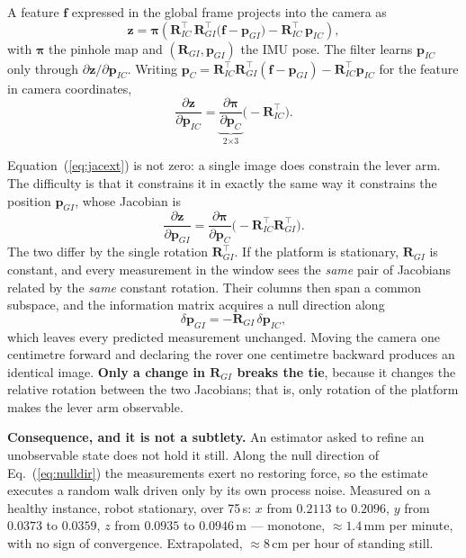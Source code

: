 A feature $\mathbf{f}$ expressed in the global frame projects into the
camera as
\begin{equation}
\mathbf{z} = \boldsymbol{\pi}\!\left(
  \mathbf{R}_{IC}^{\top}\,\mathbf{R}_{GI}^{\top}
  \bigl(\mathbf{f} - \mathbf{p}_{GI}\bigr) - \mathbf{R}_{IC}^{\top}\,\mathbf{p}_{IC}
\right),
\label{eq:projext}
\end{equation}
with $\boldsymbol\pi$ the pinhole map and $(\mathbf{R}_{GI},
\mathbf{p}_{GI})$ the IMU pose. The filter learns $\mathbf{p}_{IC}$ only
through $\partial \mathbf{z} / \partial \mathbf{p}_{IC}$. Writing
$\mathbf{p}_C = \mathbf{R}_{IC}^{\top}\mathbf{R}_{GI}^{\top}(\mathbf{f} -
\mathbf{p}_{GI}) - \mathbf{R}_{IC}^{\top}\mathbf{p}_{IC}$ for the feature in
camera coordinates,
\begin{equation}
\frac{\partial \mathbf{z}}{\partial \mathbf{p}_{IC}}
  = \underbrace{\frac{\partial \boldsymbol\pi}{\partial \mathbf{p}_C}}_{\text{2}\times\text{3}}
    \bigl(-\mathbf{R}_{IC}^{\top}\bigr).
\label{eq:jacext}
\end{equation}

Equation~(\ref{eq:jacext}) is not zero: a single image does constrain the
lever arm. The difficulty is that it constrains it in exactly the same way
it constrains the position $\mathbf{p}_{GI}$, whose Jacobian is
\begin{equation}
\frac{\partial \mathbf{z}}{\partial \mathbf{p}_{GI}}
  = \frac{\partial \boldsymbol\pi}{\partial \mathbf{p}_C}
    \bigl(-\mathbf{R}_{IC}^{\top}\mathbf{R}_{GI}^{\top}\bigr).
\end{equation}
The two differ by the single rotation $\mathbf{R}_{GI}^{\top}$. If the
platform is stationary, $\mathbf{R}_{GI}$ is constant, and every measurement
in the window sees the \emph{same} pair of Jacobians related by the
\emph{same} constant rotation. Their columns then span a common subspace,
and the information matrix acquires a null direction along
\begin{equation}
\delta\mathbf{p}_{GI} = -\mathbf{R}_{GI}\,\delta\mathbf{p}_{IC},
\label{eq:nulldir}
\end{equation}
which leaves every predicted measurement unchanged. Moving the camera
one centimetre forward and declaring the rover one centimetre backward
produces an identical image. \textbf{Only a change in $\mathbf{R}_{GI}$
breaks the tie}, because it changes the relative rotation between the two
Jacobians; that is, only rotation of the platform makes the lever arm
observable.

\begin{eqblock}
\textbf{Consequence, and it is not a subtlety.} An estimator asked to
refine an unobservable state does not hold it still. Along the null
direction of Eq.~(\ref{eq:nulldir}) the measurements exert no restoring
force, so the estimate executes a random walk driven only by its own
process noise. Measured on a healthy instance, robot stationary, over
75\,s:  $x$ from $0.2113$ to $0.2096$, $y$ from $0.0373$ to
$0.0359$, $z$ from $0.0935$ to $0.0946$\,m --- monotone, ${\approx}1.4$\,mm
per minute, with no sign of convergence. Extrapolated, ${\approx}8$\,cm per
hour of standing still.
\end{eqblock}

